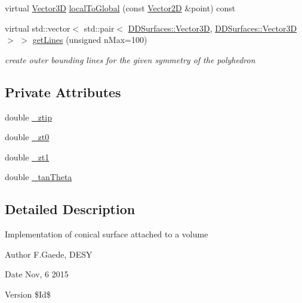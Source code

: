 \begin{DoxyCompactItemize}
\item 
virtual \hyperlink{class_d_d_surfaces_1_1_vector3_d}{Vector3D} \hyperlink{class_d_d4hep_1_1_d_d_rec_1_1_vol_cone_impl_a1428d72f28ed90522cdaa6bb4d855dce}{localToGlobal} (const \hyperlink{class_d_d_surfaces_1_1_vector2_d}{Vector2D} \&point) const 
\item 
virtual std::vector$<$ std::pair$<$ \hyperlink{class_d_d_surfaces_1_1_vector3_d}{DDSurfaces::Vector3D}, \hyperlink{class_d_d_surfaces_1_1_vector3_d}{DDSurfaces::Vector3D} $>$ $>$ \hyperlink{class_d_d4hep_1_1_d_d_rec_1_1_vol_cone_impl_ae644bf91eb0b033f16ac4d89d00dd080}{getLines} (unsigned nMax=100)
\begin{DoxyCompactList}\small\item\em create outer bounding lines for the given symmetry of the polyhedron \item\end{DoxyCompactList}\end{DoxyCompactItemize}
\subsection*{Private Attributes}
\begin{DoxyCompactItemize}
\item 
double \hyperlink{class_d_d4hep_1_1_d_d_rec_1_1_vol_cone_impl_ae42d0cc1db6c972c012f3177cdeb935b}{\_\-ztip}
\item 
double \hyperlink{class_d_d4hep_1_1_d_d_rec_1_1_vol_cone_impl_ad204cc67411301eaa8f135430392a55c}{\_\-zt0}
\item 
double \hyperlink{class_d_d4hep_1_1_d_d_rec_1_1_vol_cone_impl_aa9466fe65e7238bf90ec604132ea1825}{\_\-zt1}
\item 
double \hyperlink{class_d_d4hep_1_1_d_d_rec_1_1_vol_cone_impl_a5f020df8481dcc088af7a02632f03ae2}{\_\-tanTheta}
\end{DoxyCompactItemize}


\subsection{Detailed Description}
Implementation of conical surface attached to a volume \begin{DoxyAuthor}{Author}
F.Gaede, DESY 
\end{DoxyAuthor}
\begin{DoxyDate}{Date}
Nov, 6 2015 
\end{DoxyDate}
\begin{DoxyVersion}{Version}
\$Id\$ 
\end{DoxyVersion}


